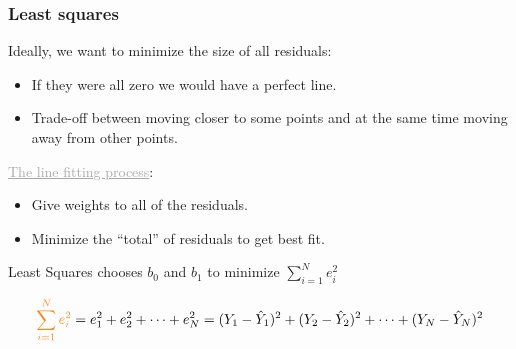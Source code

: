 \documentclass{beamer}
\newcommand{\dg}[1]{\textcolor{darkgray}{#1}}
\newcommand{\bl}{\color{lightblue}}
\newcommand{\rd}{\color{burntorange}}
\newcommand{\bk}{\color{black}}
\newcommand{\bi}{\begin{itemize}}
\newcommand{\ib}{\end{itemize}}
\newcommand{\p}{\item}
\newcommand{\sk}{\vspace{.5cm}}
\begin{document}

\begin{frame}
\frametitle{Least squares} \vspace{-0.5cm}

\sk
\sk
Ideally, we want to minimize the size of all residuals: \vspace{2mm}
\bi
\p If they were all zero we would have a perfect line.
\p Trade-off between moving closer to some points and at the same time moving away from other points.
\ib

\pause

\sk
\dg{\underline{The line fitting process}}: \vspace{2mm}
\bi
\p Give weights to all of the residuals.
\p Minimize the ``total'' of residuals to get best fit.
\ib

\vspace{-3mm}

\pause
\begin{center}\bl \large
Least Squares chooses $b_0$ and $b_1$ to minimize \rd $\sum_{i=1}^N e^2_i$\bk
\end{center}
$$
{\rd \sum_{i=1}^N e^2_i} = e^2_1 + e^2_2 + \dots + e^2_N = (Y_1 - \hat{Y}_1)^2 +(Y_2 - \hat{Y}_2)^2+\dots+(Y_N - \hat{Y}_N)^2
 $$


\end{frame}
%
%
%
%
%
%




%
%
%
\end{document}
